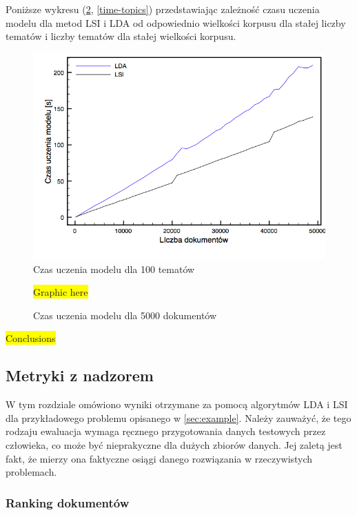 \documentclass[11pt,a4paper]{article}
\newcommand{\todo}[1]{\colorbox{yellow}{#1}}
\begin{document}
Poniższe wykresu (\ref{time-docs}, \ref{time-topics}) przedstawiając zależność
czasu uczenia modelu dla metod LSI i LDA od odpowiednio wielkości korpusu
dla stałej liczby tematów i liczby tematów dla stałej wielkości korpusu.

\begin{figure}[h]
\caption{Czas uczenia modelu dla 100 tematów}
\label{time-docs}
\includegraphics[width=\linewidth]{gfx/time_docs.png}
\end{figure}

\begin{figure}[h]
\caption{Czas uczenia modelu dla 5000 dokumentów}
\label{time-docs}
\todo{Graphic here}
\end{figure}

\todo{Conclusions}

\FloatBarrier

\subsection{Metryki z nadzorem}

W tym rozdziale omówiono wyniki otrzymane za pomocą algorytmów LDA i LSI dla
przykładowego problemu opisanego w \ref{sec:example}. Należy zauważyć, że tego
rodzaju ewaluacja wymaga ręcznego przygotowania danych testowych przez
człowieka, co może być nieprakyczne dla dużych zbiorów danych.  Jej zaletą jest
fakt, że mierzy ona faktyczne osiągi danego rozwiązania w rzeczywistych
problemach.

\subsubsection{Ranking dokumentów}
\end{document}
